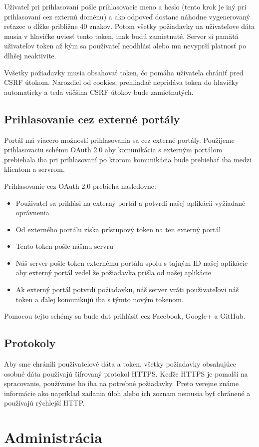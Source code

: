 Uživateľ pri prihlasovaní pošle prihlasovacie meno a heslo (tento krok je iný pri prihlasovaní cez externú doménu) a ako odpoveď
dostane náhodne vygenerovaný reťazec o dĺžke približne 40 znakov. Potom všetky požiadavky na uživateľove dáta
 musia v hlavičke uviesť tento token, inak budú zamietnuté.
Server si pamätá uživateľov token až kým sa použivateľ neodhlási alebo mu nevyprší platnosť po dlhšej neaktivite.

Vvšetky požiadavky musia obsahovať token, čo pomáha uživateľa chrániť pred CSRF útokom. Narozdiel od cookies,
prehliadač nepridáva token do hlavičky automaticky a teda väčšina CSRF útokov bude zamietnutých.

\subsection{Prihlasovanie cez externé portály}
Portál má viacero možností prihlasovania sa cez externé portály. Použijeme prihlasovaciu schému OAuth 2.0 aby komunikácia s externým
portálom prebiehala iba pri prihlasovaní po ktorom komunikácia bude prebiehať iba medzi klientom a servrom.

Prihlasovanie cez OAuth 2.0 prebieha nasledovne:
\begin{itemize}
\item{Použivateľ sa prihlási na externý portál a potvrdí našej aplikácii vyžiadané oprávnenia}
\item{Od externého portálu získa prístupový token na ten externý portál}
\item{Tento token pošle nášmu servru}
\item{Náš server pošle token externému portálu spolu s tajným ID našej aplikácie aby externý portál vedel že požiadavka prišla od našej aplikácie}
\item{Ak externý portál potvrdí požiadavku, náš server vráti použivateľovi náš token a ďalej komunikujú iba s týmto novým tokenom.}
\end{itemize}

Pomocou tejto schémy sa bude dať prihlásiť cez Facebook, Google+ a GitHub.

\subsection{Protokoly}
Aby sme chránili použivateľové dáta a token, všetky požiadavky obsahujúce osobné dáta používajú šifrovaný protokol HTTPS. Keďže HTTPS je pomalší na spracovanie,
používame ho iba na potrebné požiadavky. Preto verejne známe informácie ako napríklad zadania úloh alebo ich zoznam nemusia byť chránené a používajú rýchlejší HTTP.
\section{Administrácia}
